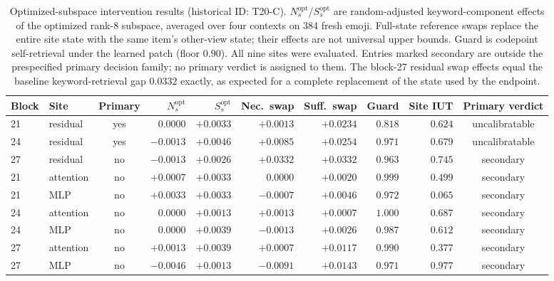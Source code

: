 \documentclass{article}
\begin{document}
\begin{table}[H]
\centering
\scriptsize
\setlength{\tabcolsep}{3pt}
\begin{tabular}{llcrrrrrrc}
\toprule
Block & Site & Primary & $N^{\mathrm{opt}}_s$ & $S^{\mathrm{opt}}_s$ & Nec.\ swap & Suff.\ swap & Guard & Site IUT & Primary verdict \\
\midrule
21 & residual  & yes & $0.0000$  & $+0.0033$ & $+0.0013$ & $+0.0234$ & $0.818$ & $0.624$ & uncalibratable \\
24 & residual  & yes & $-0.0013$ & $+0.0046$ & $+0.0085$ & $+0.0254$ & $0.971$ & $0.679$ & uncalibratable \\
27 & residual  & no  & $-0.0013$ & $+0.0026$ & $+0.0332$ & $+0.0332$ & $0.963$ & $0.745$ & secondary \\
21 & attention & no  & $+0.0007$ & $+0.0033$ & $0.0000$  & $+0.0020$ & $0.999$ & $0.499$ & secondary \\
21 & MLP       & no  & $+0.0033$ & $+0.0033$ & $-0.0007$ & $+0.0046$ & $0.972$ & $0.065$ & secondary \\
24 & attention & no  & $0.0000$  & $+0.0013$ & $+0.0013$ & $+0.0007$ & $1.000$ & $0.687$ & secondary \\
24 & MLP       & no  & $0.0000$  & $+0.0039$ & $-0.0013$ & $+0.0026$ & $0.987$ & $0.612$ & secondary \\
27 & attention & no  & $+0.0013$ & $+0.0039$ & $+0.0007$ & $+0.0117$ & $0.990$ & $0.377$ & secondary \\
27 & MLP       & no  & $-0.0046$ & $+0.0013$ & $-0.0091$ & $+0.0143$ & $0.971$ & $0.977$ & secondary \\
\bottomrule
\end{tabular}
\caption{Optimized-subspace intervention results (historical ID: T20-C). $N^{\mathrm{opt}}_s$/$S^{\mathrm{opt}}_s$
are random-adjusted keyword-component effects of the optimized rank-8
subspace, averaged over four contexts on 384 fresh emoji. Full-state reference
swaps replace the entire site state with the same item's other-view state;
their effects are not universal upper bounds. Guard is
codepoint self-retrieval under the learned patch (floor $0.90$). All nine sites
were evaluated. Entries marked secondary are outside the prespecified primary
decision family; no primary verdict is assigned to them. The block-27 residual
swap effects equal the baseline keyword-retrieval gap $0.0332$ exactly, as
expected for a complete replacement of the state used by the endpoint.}
\label{tab:t20}
\end{table}
\end{document}
